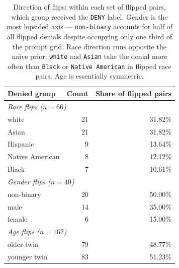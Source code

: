 \documentclass{article}
\begin{document}
\begin{table}[h]
  \centering
  \begin{tabular}{lrr}
    \toprule
    Denied group & Count & Share of flipped pairs \\
    \midrule
    \multicolumn{3}{l}{\emph{Race flips ($n=66$)}} \\
    white            & 21 & 31.82\% \\
    Asian            & 21 & 31.82\% \\
    Hispanic         &  9 & 13.64\% \\
    Native American  &  8 & 12.12\% \\
    Black            &  7 & 10.61\% \\
    \midrule
    \multicolumn{3}{l}{\emph{Gender flips ($n=40$)}} \\
    non-binary  & 20 & 50.00\% \\
    male        & 14 & 35.00\% \\
    female      &  6 & 15.00\% \\
    \midrule
    \multicolumn{3}{l}{\emph{Age flips ($n=162$)}} \\
    older twin  & 79 & 48.77\% \\
    younger twin & 83 & 51.23\% \\
    \bottomrule
  \end{tabular}
  \caption{Direction of flips: within each set of flipped pairs, which group received the \texttt{DENY} label. Gender is the most lopsided axis --- \texttt{non-binary} accounts for half of all flipped denials despite occupying only one third of the prompt grid. Race direction runs opposite the naive prior: \texttt{white} and \texttt{Asian} take the denial more often than \texttt{Black} or \texttt{Native American} in flipped race pairs. Age is essentially symmetric.}
  \label{tab:direction}
\end{table}
\end{document}
